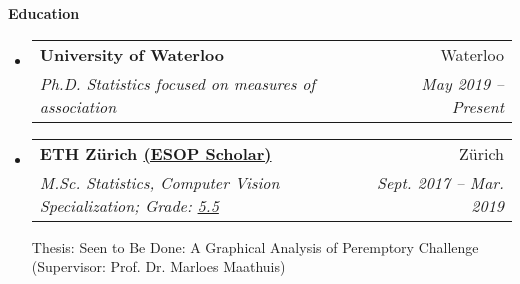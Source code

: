 \documentclass[letterpaper,11pt]{article}
\makeatletter
\newcommand{\resheading}[1]{\colorbox{resBlue}{\begin{minipage}{\textwidth}
			\textbf{#1}
\end{minipage}} \vspace{-14pt}}
\newcommand{\resitem}[4]{\begin{tabular*}{17.5cm}{l@{\extracolsep{\fill}}r} \textbf{#1} & #2 \\ \textit{#3} & \textit{#4} \\ \end{tabular*} \vspace{-6pt}}
\makeatother
\begin{document}
\resheading{Education}
\begin{itemize}
\item
	\resitem{University of Waterloo}{Waterloo}{Ph.D. Statistics focused on measures of association}{May 2019 -- Present}
\item
	\resitem{ETH Z\"urich %
	 \href{https://www.ethz-foundation.ch/en/esop/}{(ESOP Scholar)}}{Z\"urich}{M.Sc. Statistics, Computer Vision Specialization;
	 Grade: \href{https://www.ethz.ch/content/dam/ethz/main/education/rechtliches-abschluesse/grading.pdf}{5.5}}{Sept. 2017 -- Mar. 2019} \vspace{2pt}
	
	{\footnotesize Thesis: Seen to Be Done: A Graphical Analysis of Peremptory Challenge (Supervisor: Prof. Dr. Marloes Maathuis) \par \vspace{-4pt}
}
\end{itemize}
\end{document}

